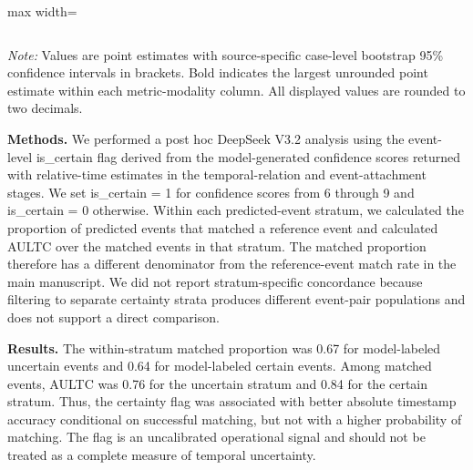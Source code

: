 \begin{minipage}{\textwidth}
\begin{adjustbox}{max width=\textwidth}
\begin{tabular}{@{}lcccccc@{}}
\bottomrule
\end{tabular}
\end{adjustbox}
\par\vspace{0.3em}
\begin{minipage}{\textwidth}
\footnotesize\textit{Note:} Values are point estimates with source-specific case-level bootstrap 95\% confidence intervals in brackets. Bold indicates the largest unrounded point estimate within each metric-modality column. All displayed values are rounded to two decimals.
\end{minipage}
\end{minipage}\par\medskip

\vspace{2mm}\noindent
\textbf{Methods.} We performed a post hoc DeepSeek V3.2 analysis using the event-level is\_certain flag derived from the model-generated confidence scores returned with relative-time estimates in the temporal-relation and event-attachment stages. We set is\_certain = 1 for confidence scores from 6 through 9 and is\_certain = 0 otherwise. Within each predicted-event stratum, we calculated the proportion of predicted events that matched a reference event and calculated AULTC over the matched events in that stratum. The matched proportion therefore has a different denominator from the reference-event match rate in the main manuscript. We did not report stratum-specific concordance because filtering to separate certainty strata produces different event-pair populations and does not support a direct comparison.

\vspace{2mm}\noindent
\textbf{Results.} The within-stratum matched proportion was 0.67 for model-labeled uncertain events and 0.64 for model-labeled certain events. Among matched events, AULTC was 0.76 for the uncertain stratum and 0.84 for the certain stratum. Thus, the certainty flag was associated with better absolute timestamp accuracy conditional on successful matching, but not with a higher probability of matching. The flag is an uncalibrated operational signal and should not be treated as a complete measure of temporal uncertainty.

